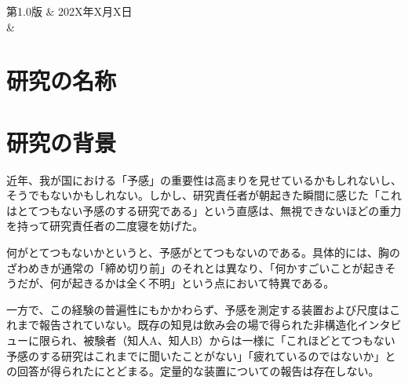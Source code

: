 \documentclass{kyodai-protocol}
\title{\ResearchTitle}
\begin{document}
\maketitle

\begin{revisionhistory}
第1.0版 & 202X年X月X日 \\ \hline
 & \\ \hline
\end{revisionhistory}

\vspace{1em}

\begin{center}
\end{center}

\tableofcontents
\newpage

\section{研究の名称}
\label{sec:title}

\ResearchTitle

\section{研究の背景}
\label{sec:background}

近年、我が国における「予感」の重要性は高まりを見せているかもしれないし、そうでもないかもしれない。しかし、研究責任者が朝起きた瞬間に感じた「これはとてつもない予感のする研究である」という直感は、無視できないほどの重力を持って研究責任者の二度寝を妨げた。

何がとてつもないかというと、予感がとてつもないのである。具体的には、胸のざわめきが通常の「締め切り前」のそれとは異なり、「何かすごいことが起きそうだが、何が起きるかは全く不明」という点において特異である。

一方で、この経験の普遍性にもかかわらず、予感を測定する装置および尺度はこれまで報告されていない。既存の知見は飲み会の場で得られた非構造化インタビューに限られ、被験者（知人A、知人B）からは一様に「これほどとてつもない予感のする研究はこれまでに聞いたことがない」「疲れているのではないか」との回答が得られたにとどまる\cite{chijin202x}。定量的な装置についての報告は存在しない。
\end{document}
